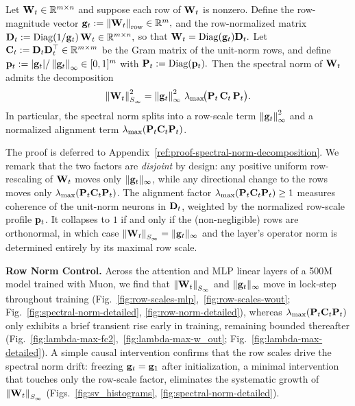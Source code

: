 \documentclass{article}
\begin{document}
\begin{proposition}
\label{prop:spectral-norm-decomposition}
Let $\mathbf{W}_t \in \mathbb{R}^{m\times n}$ and suppose each row of $\mathbf{W}_t$ is nonzero. Define the row-magnitude vector $
\mathbf{g}_t := \left \| \mathbf{W}_t \right\|_{\mathrm{row}}\in \mathbb{R}^m,
$
and the row-normalized matrix $
\mathbf{D}_t := \mathrm{Diag}\!\left(1/\mathbf{g}_t\right)\mathbf{W}_t \in \mathbb{R}^{m\times n},
$
so that $
\mathbf{W}_t=\mathrm{Diag}(\mathbf{g}_t)\mathbf{D}_t.
$
Let $
\mathbf{C}_t := \mathbf{D}_t\mathbf{D}_t^\top \in \mathbb{R}^{m\times m}
$
be the Gram matrix of the unit-norm rows, and define $
\mathbf{p}_t := |\mathbf{g}_t|/\left \| \mathbf{g}_t \right\|_\infty \in [0,1]^m$ with $\mathbf{P}_t := \mathrm{Diag}(\mathbf{p}_t).$
Then the spectral norm of $\mathbf{W}_t$ admits the decomposition 
\begin{equation*}
\left \| \mathbf{W}_t \right\|_{S_\infty}^2
=
\left \| \mathbf{g}_t \right\|_\infty^2\,\lambda_{\max}\!\bigl(\mathbf{P}_t\,\mathbf{C}_t\,\mathbf{P}_t\bigr).
\end{equation*}
In particular, the spectral norm splits into a row-scale term $\left \| \mathbf{g}_t \right\|_\infty^2$ and a normalized alignment term $\lambda_{\max}(\mathbf{P}_t\mathbf{C}_t\mathbf{P}_t)$.
\end{proposition}

The proof is deferred to Appendix~\ref{ref:proof-spectral-norm-decomposition}. We remark that the two factors are \textit{disjoint} by design: any positive uniform row-rescaling of
$\mathbf{W}_t$ moves only $\|\mathbf{g}_t\|_\infty$, while any directional change to the rows
moves only $\lambda_{\max}(\mathbf{P}_t\mathbf{C}_t\mathbf{P}_t)$. The alignment factor $\lambda_{\max}(\mathbf{P}_t\mathbf{C}_t\mathbf{P}_t)\ge 1$ measures coherence of the unit-norm neurons in $\mathbf{D}_t$, weighted by the normalized row-scale profile $\mathbf{p}_t$. It collapses to $1$ if and only if the (non-negligible) rows are orthonormal, in which case $\left \| \mathbf{W}_t \right\|_{S_\infty}=\|\mathbf{g}_t\|_\infty$ and the layer's operator norm is determined entirely by its maximal row scale.

\textbf{Row Norm Control.} Across the attention and MLP linear layers of a 500M model trained with Muon, we find that $\left \| \mathbf{W}_t \right\|_{S_\infty}$ and $\|\mathbf{g}_t\|_\infty$ move in lock-step throughout training (Fig.~\ref{fig:row-scales-mlp},~\ref{fig:row-scales-wout}; Fig.~\ref{fig:spectral-norm-detailed}, \ref{fig:row-norm-detailed}), whereas $\lambda_{\max}(\mathbf{P}_t\mathbf{C}_t\mathbf{P}_t)$ only exhibits a brief transient rise early in training, remaining bounded thereafter (Fig.~\ref{fig:lambda-max-fc2},~\ref{fig:lambda-max-w_out}; Fig.~\ref{fig:lambda-max-detailed}). A simple causal intervention confirms that the row scales drive the spectral norm drift: freezing $\mathbf{g}_t =\mathbf{g}_1$ after initialization, a minimal intervention that touches only the row-scale factor, eliminates the systematic growth of $\left \| \mathbf{W}_t \right\|_{S_\infty}$ (Figs.~\ref{fig:sv_histograms}, \ref{fig:spectral-norm-detailed}).
\end{document}
